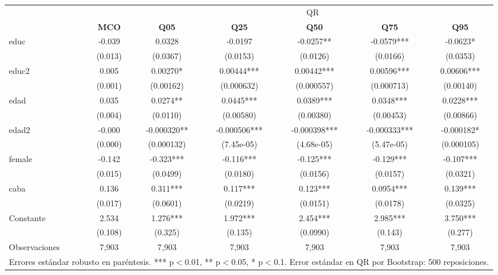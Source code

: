 {\begin{tabular}{lcccccc} 
		\hline \hline
		& & \multicolumn{5}{c}{QR} \\  \cmidrule(lr){3-7}
		& \textbf{MCO} & \textbf{Q05} & \textbf{Q25} & \textbf{Q50} & \textbf{Q75} & \textbf{Q95} \\  \hline
		educ & -0.039\sym{***} & 0.0328 & -0.0197 & -0.0257** & -0.0579*** & -0.0623* \\
		 & (0.013) & (0.0367) & (0.0153) & (0.0126) & (0.0166) & (0.0353) \\
		educ2 & 0.005\sym{***} &  0.00270* & 0.00444*** & 0.00442*** & 0.00596*** & 0.00606*** \\
		&(0.001)& (0.00162) & (0.000632) & (0.000557) & (0.000713) & (0.00140) \\
		edad & 0.035\sym{***}& 0.0274** & 0.0445*** & 0.0389*** & 0.0348*** & 0.0228*** \\
		&(0.004)  & (0.0110) & (0.00580) & (0.00380) & (0.00453) & (0.00866) \\
		edad2 & -0.000\sym{***} & -0.000320** & -0.000506*** & -0.000398*** & -0.000333*** & -0.000182* \\
		& (0.000) & (0.000132) & (7.45e-05) & (4.68e-05) & (5.47e-05) & (0.000105) \\
		female & -0.142\sym{***} & -0.323*** & -0.116*** & -0.125*** & -0.129*** & -0.107*** \\
		& (0.015) & (0.0499) & (0.0180) & (0.0156) & (0.0157) & (0.0321) \\
		caba & 0.136\sym{***} & 0.311*** & 0.117*** & 0.123*** & 0.0954*** & 0.139*** \\
		&(0.017) & (0.0601) & (0.0219) & (0.0151) & (0.0178) & (0.0325) \\
		Constante & 2.534\sym{***} & 1.276*** & 1.972*** & 2.454*** & 2.985*** & 3.750*** \\
		& (0.108)  & (0.325) & (0.135) & (0.0990) & (0.143) & (0.277) \\
		Observaciones & 7,903 & 7,903 & 7,903 & 7,903 & 7,903 & 7,903 \\ \hline
		\multicolumn{7}{c}{\small{Errores estándar robusto en paréntesis. *** p$<$0.01, ** p$<$0.05, * p$<$0.1. Error estándar en QR por Bootstrap: 500 reposiciones.}} \\
	\end{tabular}
}
